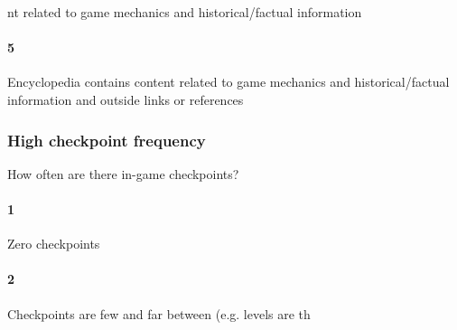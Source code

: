 nt related to game mechanics and historical/factual information\paragraph{5}Encyclopedia contains content related to game mechanics and historical/factual information and outside links or references\subsubsection{High checkpoint frequency}How often are there in-game checkpoints?\paragraph{1}Zero checkpoints\paragraph{2}Checkpoints are few and far between (e.g. levels are th